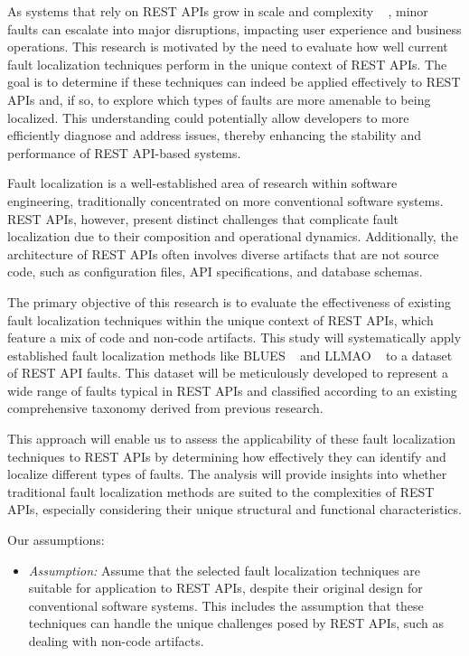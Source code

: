 \documentclass[conference]{IEEEtran}
\begin{document}
    As systems that rely on REST APIs grow in scale and complexity  ~\cite{khare2004} , minor faults can escalate into major disruptions, impacting user experience and business operations. 
    This research is motivated by the need to evaluate how well current fault localization techniques perform in the unique context of REST APIs. 
    The goal is to determine if these techniques can indeed be applied effectively to REST APIs and, if so, to explore which types of faults are more amenable to being localized. 
    This understanding could potentially allow developers to more efficiently diagnose and address issues, thereby enhancing the stability and performance of REST API-based systems.

    Fault localization is a well-established area of research within software engineering, traditionally concentrated on more conventional software systems. 
    REST APIs, however, present distinct challenges that complicate fault localization due to their composition and operational dynamics. 
    Additionally, the architecture of REST APIs often involves diverse artifacts that are not source code, such as configuration files, API specifications, and database schemas.

    The primary objective of this research is to evaluate the effectiveness of existing fault localization techniques within the unique context of REST APIs, which feature a mix of code and non-code artifacts. 
    This study will systematically apply established fault localization methods like BLUES ~\cite{ManishBluesFaultLocalization} and LLMAO ~\cite{LLMAOFaultLocalization} to a dataset of REST API faults. 
    This dataset will be meticulously developed to represent a wide range of faults typical in REST APIs and classified according to an existing comprehensive taxonomy derived from previous research.

    This approach will enable us to assess the applicability of these fault localization techniques to REST APIs by determining how effectively they can identify and localize different types of faults. 
    The analysis will provide insights into whether traditional fault localization methods are suited to the complexities of REST APIs, especially considering their unique structural and functional characteristics.

    Our assumptions:
    \begin{itemize}

        \item \textit{Assumption:} Assume that the selected fault localization techniques are suitable for application to REST APIs, despite their original design for conventional software systems. This includes the assumption that these techniques can handle the unique challenges posed by REST APIs, such as dealing with non-code artifacts.
    \end{itemize}
\end{document}
